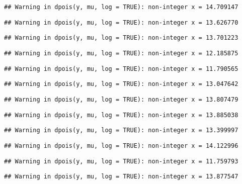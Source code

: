 \documentclass[
]{article}
\begin{document}
\begin{verbatim}
## Warning in dpois(y, mu, log = TRUE): non-integer x = 14.709147
\end{verbatim}

\begin{verbatim}
## Warning in dpois(y, mu, log = TRUE): non-integer x = 13.626770
\end{verbatim}

\begin{verbatim}
## Warning in dpois(y, mu, log = TRUE): non-integer x = 13.701223
\end{verbatim}

\begin{verbatim}
## Warning in dpois(y, mu, log = TRUE): non-integer x = 12.185875
\end{verbatim}

\begin{verbatim}
## Warning in dpois(y, mu, log = TRUE): non-integer x = 11.790565
\end{verbatim}

\begin{verbatim}
## Warning in dpois(y, mu, log = TRUE): non-integer x = 13.047642
\end{verbatim}

\begin{verbatim}
## Warning in dpois(y, mu, log = TRUE): non-integer x = 13.807479
\end{verbatim}

\begin{verbatim}
## Warning in dpois(y, mu, log = TRUE): non-integer x = 13.885038
\end{verbatim}

\begin{verbatim}
## Warning in dpois(y, mu, log = TRUE): non-integer x = 13.399997
\end{verbatim}

\begin{verbatim}
## Warning in dpois(y, mu, log = TRUE): non-integer x = 14.122996
\end{verbatim}

\begin{verbatim}
## Warning in dpois(y, mu, log = TRUE): non-integer x = 11.759793
\end{verbatim}

\begin{verbatim}
## Warning in dpois(y, mu, log = TRUE): non-integer x = 13.877547
\end{verbatim}
\end{document}
